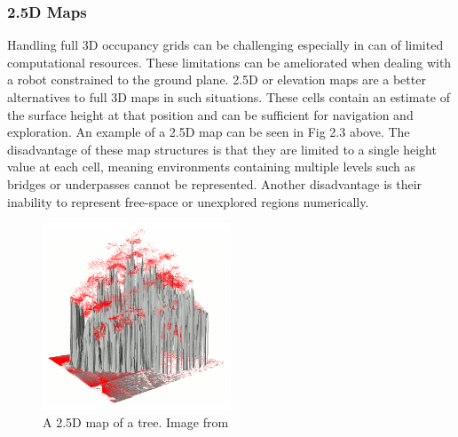 \subsubsection{2.5D Maps}
Handling full 3D occupancy grids can be challenging especially in can of limited computational resources. These limitations can be ameliorated when dealing with a robot constrained to the ground plane. 2.5D or elevation maps are a better alternatives to full 3D maps in such situations. These cells contain an estimate of the surface height at that position and can be sufficient for navigation and exploration\cite{12}\cite{13}. An example of a 2.5D map can be seen in Fig 2.3 above. The disadvantage of these map structures is that they are limited to a single height value at each cell, meaning environments containing multiple levels such as bridges or underpasses cannot be represented. Another disadvantage is their inability to represent free-space or unexplored regions numerically\cite{11}.  

\begin{figure}
    \centering
    \includegraphics[width=0.5\textwidth]{images/25D.png}
    \caption{A 2.5D map of a tree. Image from \cite{21}}
    \label{fig:my_label}
\end{figure}


